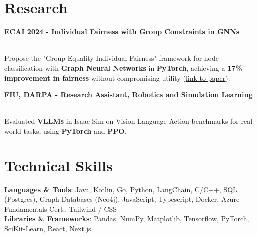\documentclass[letterpaper,11pt]{article}
\makeatletter
\newcommand{\resumeItem}[1]{
  \item\small{
    {#1 \vspace{-2pt}}
  }
}
\newcommand{\resumeProjectHeading}[2]{
    \item
    \begin{tabular*}{0.97\textwidth}{l@{\extracolsep{\fill}}r}
      \small#1 & #2 \\
    \end{tabular*}\vspace{-7pt}
}
\newcommand{\resumeSubHeadingListStart}{\begin{itemize}[leftmargin=0.15in, label={}]}
\newcommand{\resumeSubHeadingListEnd}{\end{itemize}}
\newcommand{\resumeItemListStart}{\begin{itemize}}
\newcommand{\resumeItemListEnd}{\end{itemize}\vspace{-5pt}}
\makeatother
\begin{document}
\section{Research}
\begin{itemize}[leftmargin=0.15in, label={}]
    \small{\item{\textbf{ECAI 2024 - Individual Fairness with Group Constraints in GNNs}}} \\
    \small{Propose the "Group Equality Individual Fairness" framework for node classification with \textbf{Graph Neural Networks} in \textbf{PyTorch}, achieving a \textbf{17\% improvement in fairness} without compromising utility (\href{https://doi.org/10.3233/FAIA240679}{\underline{link to paper}}).}
 \end{itemize}
 \begin{itemize}[leftmargin=0.15in, label={}]
    \small{\item{\textbf{FIU, DARPA - Research Assistant, Robotics and Simulation Learning}}} \\
    \small{Evaluated \textbf{VLLMs} in Isaac-Sim on Vision-Language-Action benchmarks for real world tasks, using \textbf{PyTorch} and \textbf{PPO}.}
 \end{itemize}
 

\section{Technical Skills}
 \begin{itemize}[leftmargin=0.15in, label={}]
    \small{\item{
     \textbf{Languages \& Tools}{: Java, Kotlin, Go, Python, LangChain, C/C++, SQL (Postgres), Graph Databases (Neo4j), JavaScript, Typescript, Docker, Azure Fundamentals Cert., Tailwind / CSS} \\
     \textbf{Libraries \& Frameworks}{: Pandas, NumPy, Matplotlib, Tensorflow, PyTorch, SciKit-Learn, React, Next.js}
    }}
 \end{itemize}

\end{document}
